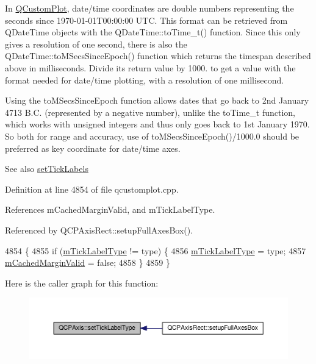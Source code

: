 In \hyperlink{class_q_custom_plot}{Q\+Custom\+Plot}, date/time coordinates are {\ttfamily double} numbers representing the seconds since 1970-\/01-\/01\+T00\+:00\+:00 U\+T\+C. This format can be retrieved from Q\+Date\+Time objects with the Q\+Date\+Time\+::to\+Time\+\_\+t() function. Since this only gives a resolution of one second, there is also the Q\+Date\+Time\+::to\+M\+Secs\+Since\+Epoch() function which returns the timespan described above in milliseconds. Divide its return value by 1000. to get a value with the format needed for date/time plotting, with a resolution of one millisecond.

Using the to\+M\+Secs\+Since\+Epoch function allows dates that go back to 2nd January 4713 B.\+C. (represented by a negative number), unlike the to\+Time\+\_\+t function, which works with unsigned integers and thus only goes back to 1st January 1970. So both for range and accuracy, use of to\+M\+Secs\+Since\+Epoch()/1000.0 should be preferred as key coordinate for date/time axes.

\begin{DoxySeeAlso}{See also}
\hyperlink{class_q_c_p_axis_a04ba16e1f6f78d70f938519576ed32c8}{set\+Tick\+Labels} 
\end{DoxySeeAlso}


Definition at line 4854 of file qcustomplot.\+cpp.



References m\+Cached\+Margin\+Valid, and m\+Tick\+Label\+Type.



Referenced by Q\+C\+P\+Axis\+Rect\+::setup\+Full\+Axes\+Box().


\begin{DoxyCode}
4854                                              \{
4855   \textcolor{keywordflow}{if} (\hyperlink{class_q_c_p_axis_a6e056c1cb1aab0eddebfebbcb78c8f90}{mTickLabelType} != type) \{
4856     \hyperlink{class_q_c_p_axis_a6e056c1cb1aab0eddebfebbcb78c8f90}{mTickLabelType} = type;
4857     \hyperlink{class_q_c_p_axis_a2cde37b6e385f47e11322df4ac1b0e9b}{mCachedMarginValid} = \textcolor{keyword}{false};
4858   \}
4859 \}
\end{DoxyCode}


Here is the caller graph for this function\+:\nopagebreak
\begin{figure}[H]
\begin{center}
\leavevmode
\includegraphics[width=350pt]{class_q_c_p_axis_a54f24f5ce8feea25209388a863d7e448_icgraph}
\end{center}
\end{figure}



